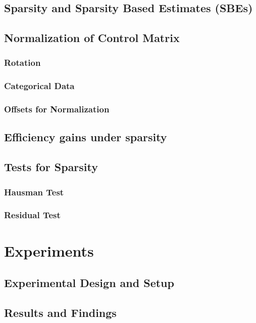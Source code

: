\subsection{Sparsity and Sparsity Based Estimates (SBEs)}

\subsection{Normalization of Control Matrix}

\subsubsection{Rotation}

\subsubsection{Categorical Data}

\subsubsection{Offsets for Normalization}

\subsection{Efficiency gains under sparsity}


\subsection{Tests for Sparsity}

\subsubsection{Hausman Test}

\subsubsection{Residual Test}


\section{Experiments}

\subsection{Experimental Design and Setup}

\subsection{Results and Findings}

